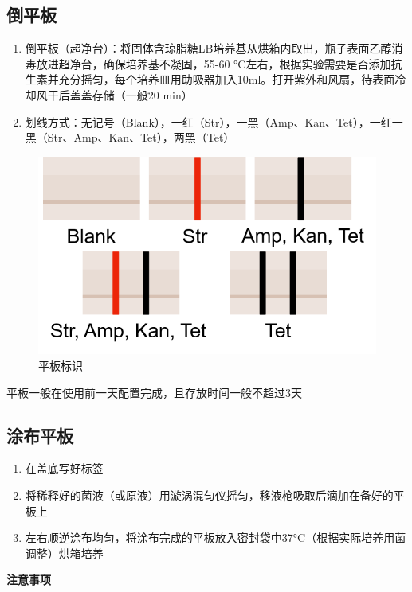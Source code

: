 \documentclass[
]{book}
\providecommand{\tightlist}{%
  \setlength{\itemsep}{0pt}\setlength{\parskip}{0pt}}
\begin{document}
\hypertarget{ux5012ux5e73ux677f}{%
\subsection{倒平板}\label{ux5012ux5e73ux677f}}

\begin{enumerate}
\def\labelenumi{\arabic{enumi}.}
\item
  倒平板（超净台）：将固体含琼脂糖LB培养基从烘箱内取出，瓶子表面乙醇消毒放进超净台，确保培养基不凝固，55-60 °C左右，根据实验需要是否添加抗生素并充分摇匀，每个培养皿用助吸器加入10ml。打开紫外和风扇，待表面冷却风干后盖盖存储（一般20 min）
\item
  划线方式：无记号（Blank），一红（Str），一黑（Amp、Kan、Tet），一红一黑（Str、Amp、Kan、Tet），两黑（Tet）
\end{enumerate}

\begin{figure}

{\centering \includegraphics[width=0.45\linewidth]{images/平板标识} 

}

\caption{平板标识}\label{fig:unnamed-chunk-1}
\end{figure}

平板一般在使用前一天配置完成，且存放时间一般不超过3天

\hypertarget{ux6d82ux5e03ux5e73ux677f}{%
\subsection{涂布平板}\label{ux6d82ux5e03ux5e73ux677f}}

\begin{enumerate}
\def\labelenumi{\arabic{enumi}.}
\tightlist
\item
  在盖底写好标签
\item
  将稀释好的菌液（或原液）用漩涡混匀仪摇匀，移液枪吸取后滴加在备好的平板上
\item
  左右顺逆涂布均匀，将涂布完成的平板放入密封袋中37°C（根据实际培养用菌调整）烘箱培养
\end{enumerate}

\textbf{注意事项}
\end{document}
